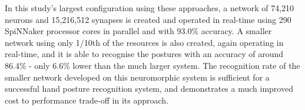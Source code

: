 \documentclass[journal]{journal}
\begin{document}

In this study's largest configuration using these approaches, a network of 74,210 neurons and 15,216,512 synapses is created and operated in real-time using 290 SpiNNaker processor cores in parallel and with 93.0\% accuracy.
A smaller network using only 1/10th of the resources is also created, again operating in real-time, and it is able to recognise the postures with an accuracy of around 86.4\% - only 6.6\% lower than the much larger system.
The recognition rate of the smaller network developed on this neuromorphic system is sufficient for a successful hand posture recognition system, and demonstrates a much improved cost to performance trade-off in its approach.
\end{document}
